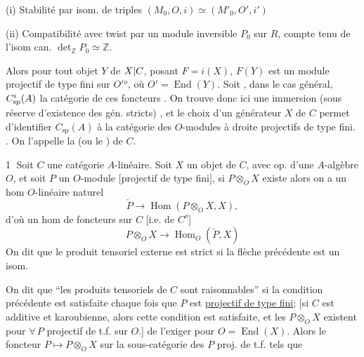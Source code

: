 (i) Stabilité par isom. de triples
$(M_0,O,i)\simeq(M'_0,O',i')$

(ii) Compatibilité avec twist par un module inversible $P_0$ sur $R$, compte tenu de l'isom can.
$\det_{\mathbb Z}P_0\simeq\mathbb Z$.


Alors pour tout objet $Y$ de $X|C$,  posant $F=i(X)$,
$F(Y)$ est un module  projectif de type fini sur $O'{}^o$, où $O'=\operatorname{End}(Y)$.
Soit , dans le cas général,
$C_{\mathrm{sp}}^{i}(A)$ la catégorie de ces foncteurs .
On trouve donc ici une immersion (sous réserve d'existence des gén. stricts)
,
et le choix d'un générateur  $X$ de $C$ permet d'identifier
$C_{\mathrm{sp}}(A)$ à la catégorie des $O$-modules à droite projectifs de type fini.
. On l'appelle la
(ou le  ) de $C$.


\textcircled{1} Soit $C$ une catégorie $A$-linéaire. Soit $X$ un objet de $C$, avec op. d'une $A$-algèbre $O$, et soit $P$ un $O$-module  $[$projectif de type fini$]$, si $P\otimes_O X$ existe alors on a un hom  $O$-linéaire  naturel
\[
\check P\longrightarrow\operatorname{Hom}(P\otimes_O X,X),
\]
d'où un hom de  foncteurs  sur $C$ $[$i.e. de $C^o$]
\[
P\otimes_O X\longrightarrow\operatorname{Hom}_O(\check P,X)
\]
On dit que le produit tensoriel externe  est strict si la flèche précédente est un isom.

On dit que  ``les produits tensoriels  de $C$ sont raisonnables'' si la condition précédente est satisfaite chaque fois que $P$ est \uline{projectif de type fini};
$[$si $C$ est additive et karoubienne, 
alors cette condition est satisfaite, et les $P\otimes_O X$ existent pour $\forall\,P$ projectif de t.f. sur $O.$]
 de l'exiger pour $O=\operatorname{End}(X)$.
Alors le foncteur $P\longmapsto P\otimes_O X$ sur la sous-catégorie des $P$ proj. de t.f. tels que

